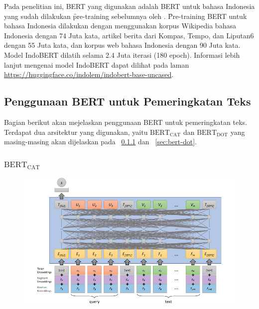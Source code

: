 	Pada penelitian ini, BERT yang digunakan adalah BERT untuk bahasa Indonesia yang sudah dilakukan \f{pre-training} sebelumnya oleh \cite{indobert}. \f{Pre-training} BERT untuk bahasa Indonesia dilakukan dengan menggunakan korpus Wikipedia bahasa Indonesia dengan 74 Juta kata, artikel berita dari Kompas, Tempo, dan Liputan6 dengan 55 Juta kata, dan korpus web bahasa Indonesia dengan 90 Juta kata. Model IndoBERT dilatih selama 2.4 Juta iterasi (180 epoch). Informasi lebih lanjut mengenai model IndoBERT dapat dilihat pada laman \url{https://huggingface.co/indolem/indobert-base-uncased}.


	\subsection{Penggunaan BERT untuk Pemeringkatan Teks}
	Bagian berikut akan mejelaskan penggunaan BERT untuk pemeringkatan teks. Terdapat dua arsitektur yang digunakan, yaitu $\text{BERT}_{\text{CAT}}$ dan $\text{BERT}_{\text{DOT}}$ yang masing-masing akan dijelaskan pada \sect~\ref{sec:bert-cat} dan \sect~\ref{sec:bert-dot}.

	\subsubsection{$\text{BERT}_{\text{CAT}}$}
		\label{sec:bert-cat}

		\begin{figure}[!ht]
			\centering
			\includegraphics[width=1\textwidth]{assets/pics/bertcat.png}
			\label{fig:bert-cat}
		\end{figure}

